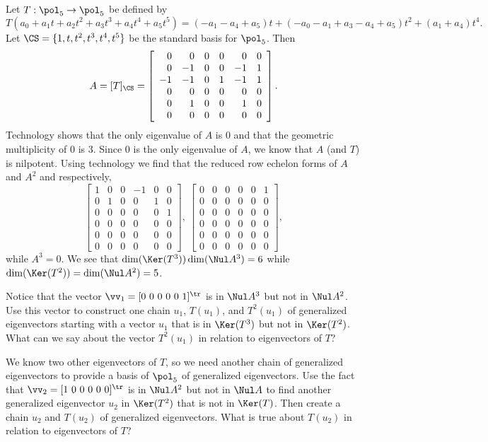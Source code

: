 \begin{activity} \label{act:JCF_Lem_2} Let $T: \pol_5 \to \pol_5$ be defined by 
\[T(a_0+a_1t+a_2t^2+a_3t^3+a_4t^4+a_5t^5) = (-a_1-a_4+a_5)t + (-a_0-a_1+a_3-a_4+a_5)t^2 + (a_1+a_4)t^4.\]
Let $\CS = \{1,t,t^2,t^3,t^4,t^5\}$ be the standard basis for $\pol_5$. Then
\[A = [T]_{\CS} = \left[ \begin{array}{rrccrc} 0&0&0&0&0&0 \\ 0&-1&0&0&-1&1 \\ -1&-1&0&1&-1&1 \\ 0&0&0&0&0&0 \\ 0&1&0&0&1&0 \\ 0&0&0&0&0&0 \end{array}\right].\]
Technology shows that the only eigenvalue of $A$ is $0$ and that the geometric multiplicity of $0$ is $3$. Since $0$ is the only eigenvalue of $A$, we know that $A$ (and $T$) is nilpotent. Using technology we find that the reduced row echelon forms of $A$ and $A^2$ and respectively, 
\[\left[ \begin{array}{cccrcc} 1&0&0&-1&0&0 \\ 0&1&0&0&1&0 \\ 0&0&0&0&0&1 \\ 0&0&0&0&0&0 \\ 0&0&0&0&0&0 \\ 0&0&0&0&0&0 \end{array} \right], \ \left[ \begin{array}{cccrcc} 0&0&0&0&0&1 \\ 0&0&0&0&0&0 \\ 0&0&0&0&0&0 \\ 0&0&0&0&0&0 \\ 0&0&0&0&0&0 \\ 0&0&0&0&0&0 \end{array} \right],\]
while $A^3 = 0$. We see that $\dim(\Ker(T^3)) \dim(\Nul A^3) = 6$ while $\dim(\Ker(T^2)) = \dim(\Nul A^2) = 5$. 
\ba
\item Notice that the vector $\vv_1 = [0 \ 0 \ 0 \ 0 \ 0 \ 1]^{\tr}$ is in $\Nul A^3$ but not in $\Nul A^2$. Use this vector to construct one chain $u_1$, $T(u_1)$, and $T^2(u_1)$ of generalized eigenvectors starting with a vector $u_1$ that is in $\Ker(T^3)$ but not in $\Ker(T^2)$. What can we say about the vector $T^2(u_1)$ in relation to eigenvectors of $T$? 

\item We know two other eigenvectors of $T$, so we need another chain of generalized eigenvectors to provide a basis of $\pol_5$ of generalized eigenvectors. Use the fact that $\vv_2 = [1 \ 0 \ 0 \ 0 \ 0 \ 0]^{\tr}$ is in $\Nul A^2$ but not in $\Nul A$ to find another generalized eigenvector $u_2$ in $\Ker(T^2)$ that is not in $\Ker(T)$. Then create a chain $u_2$ and $T(u_2)$ of generalized eigenvectors. What is true about $T(u_2)$ in relation to eigenvectors of $T$?


\end{activity}
